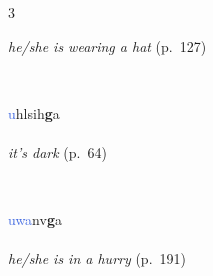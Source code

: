 \documentclass[oneside,openany]{book}%
\begin{document}
\begin{multicols}{3}
\begin{minipage}[t]{\linewidth}
\noindent \textit{he/she is wearing a hat} (p.~127)
\end{minipage}\\[1em]%
\begin{minipage}[t]{\linewidth}
\raggedright\noindent \textcolor{RoyalBlue}{u}hlsih\textbf{g}a\\
\\
\noindent \textit{it's dark} (p.~64)
\end{minipage}\\[1em]%
\begin{minipage}[t]{\linewidth}
\raggedright\noindent \textcolor{RoyalBlue}{uwa}nv\textbf{g}a\\
\\
\noindent \textit{he/she is in a hurry} (p.~191)
\end{minipage}\\[1em]%
\end{multicols}%
\vspace{1em}%
\needspace{1.5in}%
\end{document}
